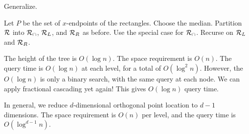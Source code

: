 Generalize.
\begin{solution}
    Let $P$ be the set of $x$-endpoints of the rectangles.
    Choose the median.
    Partition $\mathcal{R}$ into $\mathcal{R}_\cap$, $\mathcal{R}_L$, and $\mathcal{R}_R$
    as before.
    Use the special case for $\mathcal{R}_\cap$.
    Recurse on $\mathcal{R}_L$ and $\mathcal{R}_R$.

    The height of the tree is $O(\log n)$.
    The space requirement is $O(n)$.
    The query time is $O(\log n)$ at each level, for a total of
    $O(\log^2 n)$.
    However, the $O(\log n)$ is only a binary search, with the same query
    at each node.
    We can apply fractional cascading yet again!
    This gives $O(\log n)$ query time.

    In general, we reduce $d$-dimensional orthogonal point location to
    $d-1$ dimensions.
    The space requirement is $O(n)$ per level, and the query time is
    $O(\log^{d-1} n)$.
\end{solution}
